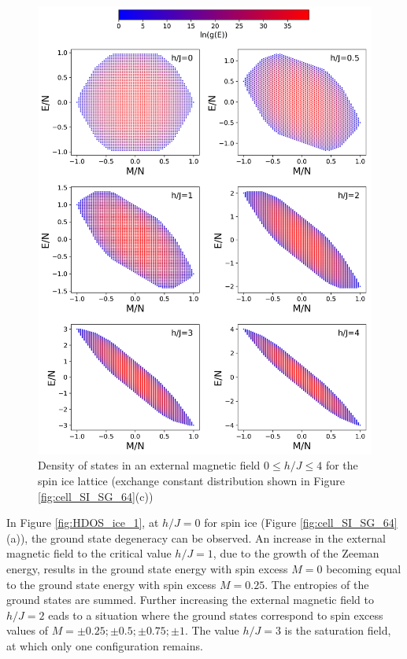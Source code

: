 \documentclass[utf8, babel, sor, jor, amsmath, amssymb, reprint]{elsarticle} %
\begin{document}
\begin{figure}[H]
	\centering
	\includegraphics[width=1\linewidth]{pictures/HDOS_SI_64_J0.png}
	\caption{Density of states in an external magnetic field $0\leq h/J \leq 4$ for the spin ice lattice (exchange constant distribution shown in Figure \ref{fig:cell_SI_SG_64}(c))}
	\label{fig:HDOS_ice}
\end{figure}


In Figure \ref{fig:HDOS_ice_1}, at $h/J=0$ for spin ice (Figure \ref{fig:cell_SI_SG_64}(a)), the ground state degeneracy can be observed. An increase in the external magnetic field to the critical value $h/J=1$, due to the growth of the Zeeman energy, results in the ground state energy with spin excess $M=0$ becoming equal to the ground state energy with spin excess $M=0.25$. The entropies of the ground states are summed.
Further increasing the external magnetic field to $h/J=2$ eads to a situation where the ground states correspond to spin excess values of $M=\pm0.25; \pm0.5; \pm0.75; \pm1$.
The value  $h/J=3$ is the saturation field, at which only one configuration remains.
\end{document}
